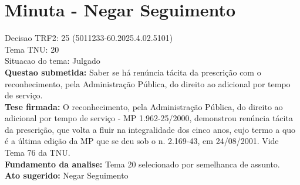 \documentclass{article}
\begin{document}
\section*{Minuta - Negar Seguimento}
Decisao TRF2: 25 (5011233-60.2025.4.02.5101)\\
Tema TNU: 20\\
Situacao do tema: Julgado\\
\textbf{Questao submetida:} Saber se há renúncia tácita da prescrição com o reconhecimento, pela Administração Pública, do direito ao adicional por tempo de serviço.\\
\textbf{Tese firmada:} O reconhecimento, pela Administração Pública, do direito ao adicional por tempo de serviço - MP 1.962-25/2000, demonstrou renúncia tácita da prescrição, que volta a fluir na integralidade dos cinco anos, cujo termo a quo é a última edição da MP que se deu sob o n. 2.169-43, em 24/08/2001. Vide Tema 76 da TNU.\\
\textbf{Fundamento da analise:} Tema 20 selecionado por semelhanca de assunto.\\
\textbf{Ato sugerido:} Negar Seguimento
\end{document}
